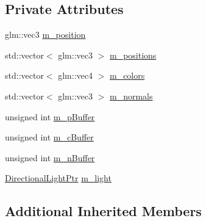 \subsection*{Private Attributes}
\begin{DoxyCompactItemize}
\item 
glm\+::vec3 \hyperlink{classDirectionalLightRenderable_aa5d35d4b87584a1a1fd44c0aaa6583cd}{m\+\_\+position}
\item 
std\+::vector$<$ glm\+::vec3 $>$ \hyperlink{classDirectionalLightRenderable_a75710cee9753842958f58c4ef34bf0e9}{m\+\_\+positions}
\item 
std\+::vector$<$ glm\+::vec4 $>$ \hyperlink{classDirectionalLightRenderable_a74752273696bdaf32922d0588eb5ffbe}{m\+\_\+colors}
\item 
std\+::vector$<$ glm\+::vec3 $>$ \hyperlink{classDirectionalLightRenderable_a2300d0c32113e49e1078e52ea59cfd2c}{m\+\_\+normals}
\item 
unsigned int \hyperlink{classDirectionalLightRenderable_aaa4a4aa8e51d7d1acec1586b207fd00c}{m\+\_\+p\+Buffer}
\item 
unsigned int \hyperlink{classDirectionalLightRenderable_a0127ba14dca5423b39dd3fc48f9f320b}{m\+\_\+c\+Buffer}
\item 
unsigned int \hyperlink{classDirectionalLightRenderable_afb94e4253a5c4af4a6cd25b443b71ba4}{m\+\_\+n\+Buffer}
\item 
\hyperlink{Light_8hpp_ad8ef93288a101a8d8f185fb2a88f496d}{Directional\+Light\+Ptr} \hyperlink{classDirectionalLightRenderable_a9486047a7b997642ce897b0d4e241d19}{m\+\_\+light}
\end{DoxyCompactItemize}
\subsection*{Additional Inherited Members}


